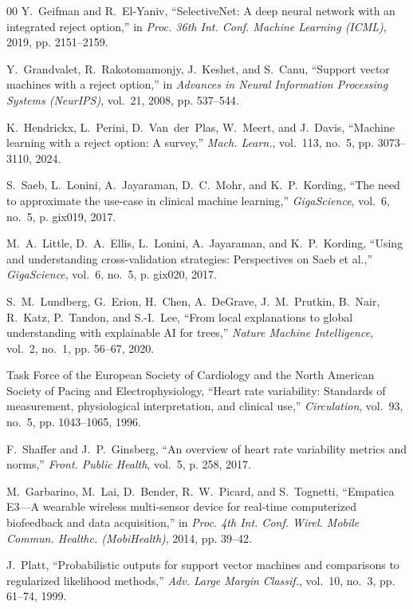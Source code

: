 \documentclass[conference]{IEEEtran}
\begin{document}
\begin{thebibliography}{00}
Y.~Geifman and R.~El-Yaniv, ``SelectiveNet: A deep neural network with an integrated reject option,'' in \textit{Proc. 36th Int. Conf. Machine Learning (ICML)}, 2019, pp. 2151--2159.

Y.~Grandvalet, R.~Rakotomamonjy, J.~Keshet, and S.~Canu, ``Support vector machines with a reject option,'' in \textit{Advances in Neural Information Processing Systems (NeurIPS)}, vol.~21, 2008, pp. 537--544.

K.~Hendrickx, L.~Perini, D.~Van~der~Plas, W.~Meert, and J.~Davis, ``Machine learning with a reject option: A survey,'' \textit{Mach. Learn.}, vol.~113, no.~5, pp. 3073--3110, 2024.

S.~Saeb, L.~Lonini, A.~Jayaraman, D.~C.~Mohr, and K.~P.~Kording, ``The need to approximate the use-case in clinical machine learning,'' \textit{GigaScience}, vol.~6, no.~5, p. gix019, 2017.

M.~A.~Little, D.~A.~Ellis, L.~Lonini, A.~Jayaraman, and K.~P.~Kording, ``Using and understanding cross-validation strategies: Perspectives on Saeb et al.,'' \textit{GigaScience}, vol.~6, no.~5, p. gix020, 2017.

S.~M.~Lundberg, G.~Erion, H.~Chen, A.~DeGrave, J.~M.~Prutkin, B.~Nair, R.~Katz, P.~Tandon, and S.-I.~Lee, ``From local explanations to global understanding with explainable AI for trees,'' \textit{Nature Machine Intelligence}, vol.~2, no.~1, pp. 56--67, 2020.

Task Force of the European Society of Cardiology and the North American Society of Pacing and Electrophysiology, ``Heart rate variability: Standards of measurement, physiological interpretation, and clinical use,'' \textit{Circulation}, vol.~93, no.~5, pp. 1043--1065, 1996.

F.~Shaffer and J.~P.~Ginsberg, ``An overview of heart rate variability metrics and norms,'' \textit{Front. Public Health}, vol.~5, p. 258, 2017.

M.~Garbarino, M.~Lai, D.~Bender, R.~W.~Picard, and S.~Tognetti, ``Empatica E3---A wearable wireless multi-sensor device for real-time computerized biofeedback and data acquisition,'' in \textit{Proc. 4th Int. Conf. Wirel. Mobile Commun. Healthc. (MobiHealth)}, 2014, pp. 39--42.

J.~Platt, ``Probabilistic outputs for support vector machines and comparisons to regularized likelihood methods,'' \textit{Adv. Large Margin Classif.}, vol.~10, no.~3, pp. 61--74, 1999.


\end{thebibliography}
\end{document}
